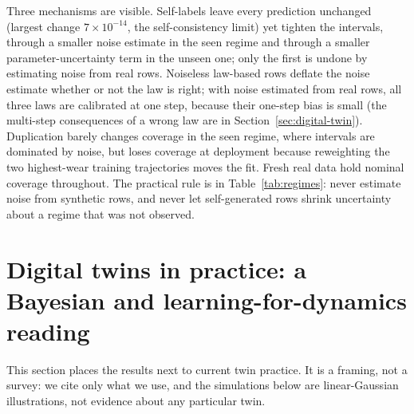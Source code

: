 Three mechanisms are visible. Self-labels leave every prediction unchanged (largest change $7\times10^{-14}$, the self-consistency limit) yet tighten the intervals, through a smaller noise estimate in the seen regime and through a smaller parameter-uncertainty term in the unseen one; only the first is undone by estimating noise from real rows. Noiseless law-based rows deflate the noise estimate whether or not the law is right; with noise estimated from real rows, all three laws are calibrated at one step, because their one-step bias is small (the multi-step consequences of a wrong law are in Section~\ref{sec:digital-twin}). Duplication barely changes coverage in the seen regime, where intervals are dominated by noise, but loses coverage at deployment because reweighting the two highest-wear training trajectories moves the fit. Fresh real data hold nominal coverage throughout. The practical rule is in Table~\ref{tab:regimes}: never estimate noise from synthetic rows, and never let self-generated rows shrink uncertainty about a regime that was not observed.

\section{Digital twins in practice: a Bayesian and learning-for-dynamics reading}\label{app:bayes-twins}
This section places the results next to current twin practice. It is a framing, not a survey: we cite only what we use, and the simulations below are linear-Gaussian illustrations, not evidence about any particular twin.

